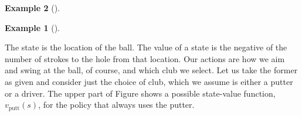 \documentclass[
  letterpaper,
]{krantz}
\theoremstyle{plain}
\theoremstyle{definition}
\newtheorem{example}{Example}[chapter]
\theoremstyle{definition}
\theoremstyle{remark}
\begin{document}
\begin{example}[]
\begin{example}[]\protect\hypertarget{exm-golf}{}\label{exm-golf}

The state is the location of the ball. The value of a state is the
negative of the number of strokes to the hole from that location. Our
actions are how we aim and swing at the ball, of course, and which club
we select. Let us take the former as given and consider just the choice
of club, which we assume is either a putter or a driver. The upper part
of Figure shows a possible state-value function,
\(v_{\text{putt}} (s)\), for the policy that always uses the putter.

\end{example}

\begin{figure}



\end{figure}
\end{example}
\end{document}
